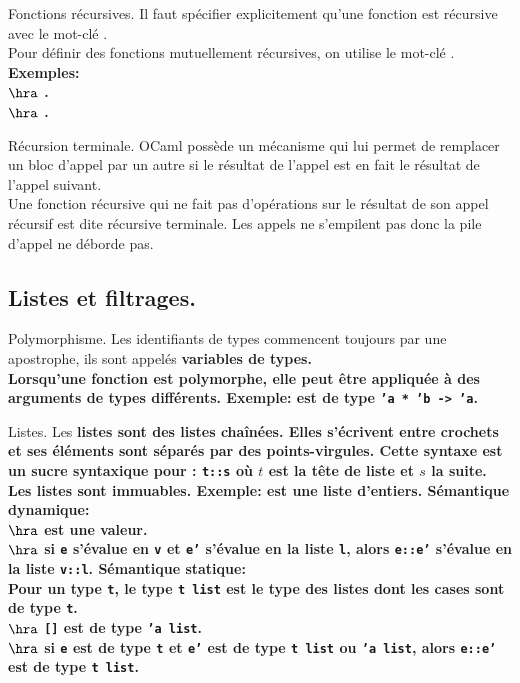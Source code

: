 \documentclass[french, 11pt]{article}
\begin{document}
\begin{defi}{Fonctions récursives.}{}
    Il faut spécifier explicitement qu'une fonction est récursive avec le mot-clé .\\
    Pour définir des fonctions mutuellement récursives, on utilise le mot-clé .\\
    \bf{Exemples:}\\
    $\hra$ .\\
    $\hra$ .
\end{defi}

\begin{defi}{Récursion terminale.}{}
    OCaml possède un mécanisme qui lui permet de remplacer un bloc d'appel par un autre si le résultat de l'appel est en fait le résultat de l'appel suivant.\\
    Une fonction récursive qui ne fait pas d'opérations sur le résultat de son appel récursif est dite récursive terminale. Les appels ne s'empilent pas donc la pile d'appel ne déborde pas.
\end{defi}

\subsection{Listes et filtrages.}

\begin{defi}{Polymorphisme.}{}
    Les identifiants de types commencent toujours par une apostrophe, ils sont appelés \bf{variables de types}.\\
    Lorsqu'une fonction est \bf{polymorphe}, elle peut être appliquée à des arguments de types différents.\n
    \bf{Exemple:}  est de type \texttt{'a * 'b -> 'a}.
\end{defi}

\begin{defi}{Listes.}{}
    Les \bf{listes} sont des listes chaînées. Elles s'écrivent entre crochets et ses éléments sont séparés par des points-virgules.
    Cette syntaxe est un sucre syntaxique pour : \texttt{t::s} où $t$ est la tête de liste et $s$ la suite.
    Les listes sont immuables.\n
    \bf{Exemple:} \ocaml{[1; 2; 3]} est une liste d'entiers.\n
    \bf{Sémantique dynamique:}\\
    $\hra$ \ocaml{[]} est une valeur.\\
    $\hra$ si \texttt{e} s'évalue en \texttt{v} et \texttt{e'} s'évalue en la liste \texttt{l}, alors \texttt{e::e'} s'évalue en la liste \texttt{v::l}.\n
    \bf{Sémantique statique:}\\
    Pour un type \texttt{t}, le type \texttt{t list} est le type des listes dont les cases sont de type \texttt{t}.\\
    $\hra$ \texttt{[]} est de type \texttt{'a list}.\\
    $\hra$ si \texttt{e} est de type \texttt{t} et \texttt{e'} est de type \texttt{t list} ou \texttt{'a list}, alors \texttt{e::e'} est de type \texttt{t list}.
\end{defi}
\end{document}
